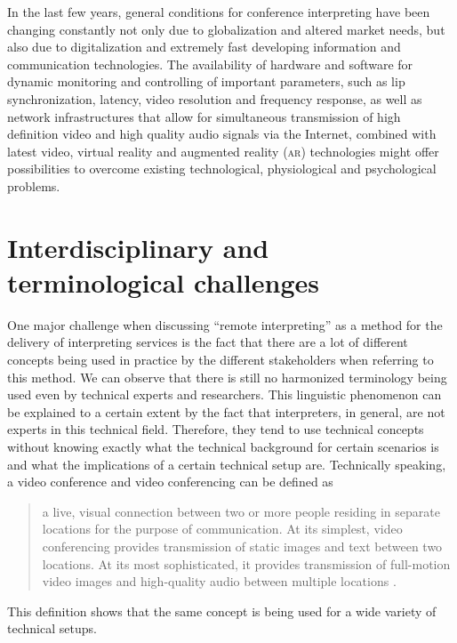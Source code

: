 \documentclass[output=paper]{langsci/langscibook}
\begin{document}
In the last few years, general conditions for conference interpreting have been changing constantly not only due to globalization and altered market needs, but also due to digitalization and extremely fast developing information and communication technologies. The availability of hardware and software for dynamic monitoring and controlling of important parameters, such as lip synchronization, latency, video resolution and frequency response, as well as network infrastructures that allow for simultaneous transmission of high definition video and high quality audio signals via the Internet, combined with latest video, virtual reality and augmented reality (\textsc{ar}) technologies might offer possibilities to overcome existing technological, physiological and psychological problems. 

\section{Interdisciplinary and terminological challenges}

\label{sec:ziegler:02}
One major challenge when discussing “remote interpreting” as a method for the delivery of interpreting services is the fact that there are a lot of different concepts being used in practice by the different stakeholders when referring to this method. We can observe that there is still no harmonized terminology being used even by technical experts and researchers. This linguistic phenomenon can be explained to a certain extent by the fact that interpreters, in general, are not experts in this technical field. Therefore, they tend to use technical concepts without knowing exactly what the technical background for certain scenarios is and what the implications of a certain technical setup are. 
Technically speaking, a video conference and video conferencing can be defined as 

\begin{quote}
	a live, visual connection between two or more people residing in separate locations for the purpose of communication. At its simplest, video conferencing provides transmission of static images and text between two locations. At its most sophisticated, it provides transmission of full-motion video images and high-quality audio between multiple locations \citep{TechTarget2017}.
\end{quote}

This definition shows that the same concept is being used for a wide variety of technical setups.
\end{document}
